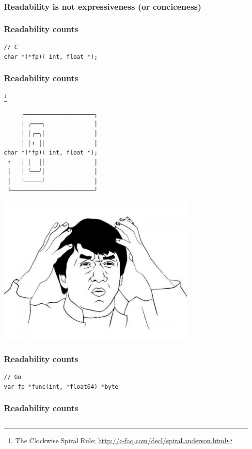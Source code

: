 \documentclass[xelatex,aspectratio=169]{beamer}
\begin{document}
\begin{frame}
	\frametitle{Readability is not expressiveness (or conciceness)}
	\centerline{}
\end{frame}

{
\renewcommand{\fcolorbox}[4][]{#4}
\begin{frame}[fragile]
	\frametitle{Readability counts}
\begin{verbatim}
// C
char *(*fp)( int, float *);
\end{verbatim}
\end{frame}
\begin{frame}[fragile]
	\frametitle{Readability counts}
	\let\thefootnote\relax
	\footnote{The Clockwise Spiral Rule; \url{http://c-faq.com/decl/spiral.anderson.html}}
	\setlength{\lineskip}{0pt}
\begin{verbatim}
     ╭────────────────────╮
     │ ╭───╮              │
     │ │╭─╮│              │
     │ │↑ ││              │
char *(*fp)( int, float *);
 ↑   │ │  ││              │
 │   │ ╰──╯│              │
 │   ╰─────╯              │
 ╰────────────────────────╯
\end{verbatim}
\end{frame}
\begin{frame}
\centerline{\includegraphics[width=0.75\textwidth]{images/jackie.jpg}}
\end{frame}
\begin{frame}[fragile]
	\frametitle{Readability counts}
\begin{verbatim}
// Go
var fp *func(int, *float64) *byte
\end{verbatim}
\end{frame}
\begin{frame}[fragile]
	\frametitle{Readability counts}
	\setlength{\lineskip}{0pt}
\begin{verbatim}

\end{verbatim}
\end{frame}}
\end{document}
